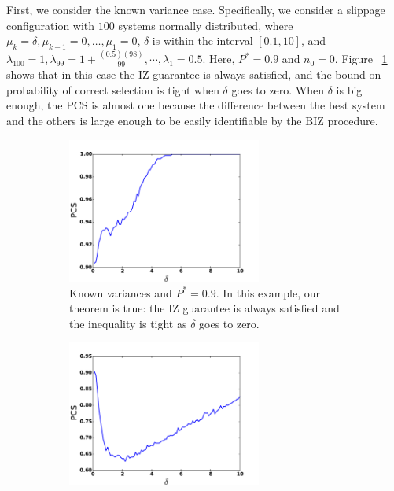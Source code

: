 \documentclass{wscpaperproc}
\theoremstyle{wsc}
\begin{document}
First, we consider the known variance case. Specifically, we consider a slippage configuration 
with $100$ systems normally distributed, where $\mu_{k}=\delta,\mu_{k-1}=0,\dots,\mu_{1}=0$, $\delta$ is 
within the interval $[0.1,10]$, and $\lambda_{100}=1,\lambda_{99}=1+\frac{(0.5)(98)}{99},\cdots,\lambda_{1}=0.5$. Here, $P^*=0.9$ and $n_{0}=0$.
Figure ~\ref{fig: tahi3} shows that in this case the IZ guarantee is always satisfied, and the bound on probability of correct selection is tight when $\delta$ goes to zero.
When $\delta$ is big enough, the PCS is almost one because the difference between the best system and the others is large enough to be easily identifiable by the
BIZ procedure.



\begin{figure}[h]
  \centering
   \begin{subfigure}[b]{0.4\textwidth}
      \centering
       \includegraphics[width=0.7\textwidth]{plot5}
    \caption{Known variances and $P^*=0.9$. In this example, our theorem is true: the IZ guarantee is always satisfied and the inequality is tight as $\delta$ goes to zero.
    \label{fig: tahi3}}
   \end{subfigure}
    \hfill
    \begin{subfigure}[b]{0.4\textwidth}
        \centering
         \includegraphics[width=0.7\textwidth]{plot3}

\end{subfigure}
\end{figure}
\end{document}
